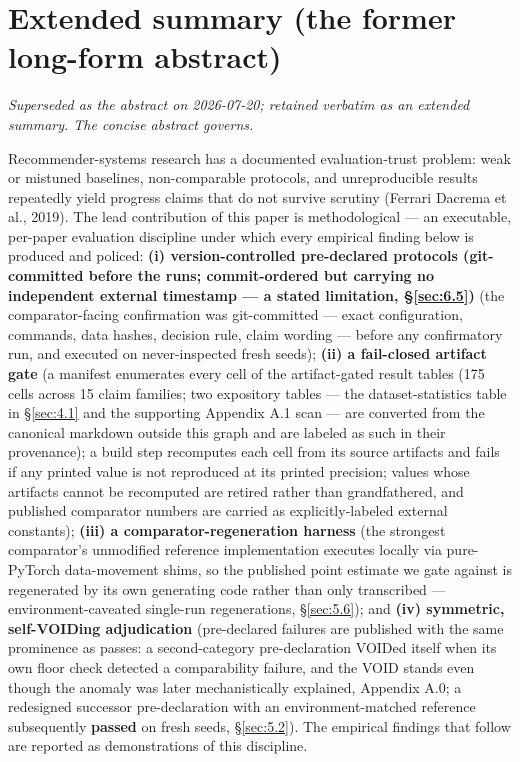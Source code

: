 \section{Extended summary (the former long-form abstract)}\label{sec:appE}

\emph{Superseded as the abstract on 2026-07-20; retained verbatim as an extended summary. The concise abstract governs.}

Recommender-systems research has a documented evaluation-trust problem: weak or mistuned baselines, non-comparable protocols, and unreproducible results repeatedly yield progress claims that do not survive scrutiny (Ferrari Dacrema et al., 2019). The lead contribution of this paper is methodological --- an executable, per-paper evaluation discipline under which every empirical finding below is produced and policed: \textbf{(i) version-controlled pre-declared protocols (git-committed before the runs; commit-ordered but carrying no independent external timestamp --- a stated limitation, \S\ref{sec:6.5})} (the comparator-facing confirmation was git-committed --- exact configuration, commands, data hashes, decision rule, claim wording --- before any confirmatory run, and executed on never-inspected fresh seeds); \textbf{(ii) a fail-closed artifact gate} (a manifest enumerates every cell of the artifact-gated result tables (175 cells across 15 claim families; two expository tables --- the dataset-statistics table in \S\ref{sec:4.1} and the supporting Appendix A.1 scan --- are converted from the canonical markdown outside this graph and are labeled as such in their provenance); a build step recomputes each cell from its source artifacts and fails if any printed value is not reproduced at its printed precision; values whose artifacts cannot be recomputed are retired rather than grandfathered, and published comparator numbers are carried as explicitly-labeled external constants); \textbf{(iii) a comparator-regeneration harness} (the strongest comparator's unmodified reference implementation executes locally via pure-PyTorch data-movement shims, so the published point estimate we gate against is regenerated by its own generating code rather than only transcribed --- environment-caveated single-run regenerations, \S\ref{sec:5.6}); and \textbf{(iv) symmetric, self-VOIDing adjudication} (pre-declared failures are published with the same prominence as passes: a second-category pre-declaration VOIDed itself when its own floor check detected a comparability failure, and the VOID stands even though the anomaly was later mechanistically explained, Appendix A.0; a redesigned successor pre-declaration with an environment-matched reference subsequently \textbf{passed} on fresh seeds, \S\ref{sec:5.2}). The empirical findings that follow are reported as demonstrations of this discipline.

